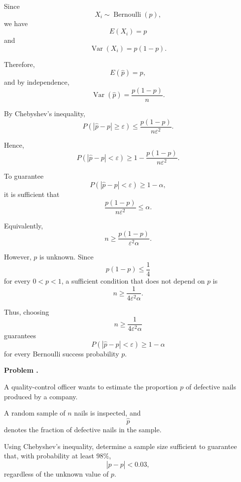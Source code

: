 \documentclass[11pt]{article}
\newcounter{problem}
\newenvironment{problem}[1][]{
    \refstepcounter{problem}
    \begin{problemheader}
        \textbf{Problem \theproblem%
        \if\relax\detokenize{#1}\relax
        \else. #1%
        \fi}
    \end{problemheader}
}{
    \vspace{0.5em}
}
\newenvironment{solution}{
    \par
    \begin{tcolorbox}[
        colback=white,
        colframe=uwgold,
        boxrule=0.7pt,
        arc=2mm,
        left=3mm,
        right=3mm,
        top=2mm,
        bottom=2mm,
        breakable,
        before skip=0.5em,
        after skip=1em,
        title=\textbf{Solution},
        coltitle=uwpurple,
        fonttitle=\bfseries
    ]
}{
    \end{tcolorbox}
}
\begin{document}
\begin{solution}

Since
\[
X_i\sim\operatorname{Bernoulli}(p),
\]
we have
\[
E(X_i)=p
\]
and
\[
\operatorname{Var}(X_i)=p(1-p).
\]

Therefore,
\[
E(\widehat p)=p,
\]
and by independence,
\[
\operatorname{Var}(\widehat p)
=
\frac{p(1-p)}{n}.
\]

By Chebyshev's inequality,
\[
P(|\widehat p-p|\geq\varepsilon)
\leq
\frac{
p(1-p)
}{
n\varepsilon^2
}.
\]

Hence,
\[
P(|\widehat p-p|<\varepsilon)
\geq
1-
\frac{
p(1-p)
}{
n\varepsilon^2
}.
\]

To guarantee
\[
P(|\widehat p-p|<\varepsilon)
\geq
1-\alpha,
\]
it is sufficient that
\[
\frac{
p(1-p)
}{
n\varepsilon^2
}
\leq
\alpha.
\]

Equivalently,
\[
n
\geq
\frac{
p(1-p)
}{
\varepsilon^2\alpha
}.
\]

However, \(p\) is unknown. Since
\[
p(1-p)
\leq
\frac14
\]
for every \(0<p<1\), a sufficient condition that does not depend on \(p\) is
\[
n
\geq
\frac{
1
}{
4\varepsilon^2\alpha
}.
\]

Thus, choosing
\[
n
\geq
\frac1{4\varepsilon^2\alpha}
\]
guarantees
\[
P(|\widehat p-p|<\varepsilon)
\geq
1-\alpha
\]
for every Bernoulli success probability \(p\).

\end{solution}



\newpage
\begin{problem}

A quality-control officer wants to estimate the proportion \(p\) of defective
nails produced by a company.

A random sample of \(n\) nails is inspected, and
\[
\widehat p
\]
denotes the fraction of defective nails in the sample.

Using Chebyshev's inequality, determine a sample size sufficient to guarantee
that, with probability at least \(98\%\),
\[
|\widehat p-p|<0.03,
\]
regardless of the unknown value of \(p\).

\end{problem}
\end{document}

